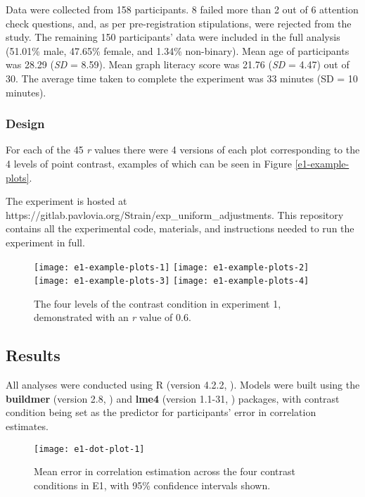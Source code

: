 \documentclass[preprint, 3p,
authoryear]{elsarticle} %
\begin{document}
Data were collected from 158 participants. 8 failed more than 2 out of 6
attention check questions, and, as per pre-registration stipulations,
were rejected from the study. The remaining 150 participants' data were
included in the full analysis (51.01\% male, 47.65\% female, and 1.34\%
non-binary). Mean age of participants was 28.29 (\emph{SD} = 8.59). Mean
graph literacy score was 21.76 (\emph{SD} = 4.47) out of 30. The average
time taken to complete the experiment was 33 minutes (SD = 10 minutes).

\hypertarget{design}{%
\subsubsection{Design}\label{design}}

For each of the 45 \emph{r} values there were 4 versions of each plot
corresponding to the 4 levels of point contrast, examples of which can
be seen in Figure \ref{e1-example-plots}.

The experiment is hosted at
https://gitlab.pavlovia.org/Strain/exp\_uniform\_adjustments. This
repository contains all the experimental code, materials, and
instructions needed to run the experiment in full.

\begin{figure}

\texttt{[image: e1-example-plots-1]} \texttt{[image: e1-example-plots-2]} \texttt{[image: e1-example-plots-3]} \texttt{[image: e1-example-plots-4]} \hfill{}

\caption{\label{e1-example-plots}The four levels of the contrast condition in experiment 1, demonstrated with an \textit{r} value of 0.6.}\label{fig:e1-example-plots}
\end{figure}

\hypertarget{results}{%
\subsection{Results}\label{results}}

All analyses were conducted using R (version 4.2.2, \citealp{r_core}).
Models were built using the \textbf{buildmer} (version 2.8,
\citealp{voeten_buildmer_2022}) and \textbf{lme4} (version 1.1-31,
\citealp{bates_lme4_2015}) packages, with contrast condition being set
as the predictor for participants' error in correlation estimates.

\begin{figure}

\texttt{[image: e1-dot-plot-1]} \hfill{}

\caption{\label{e1-dot-plot}Mean error in correlation estimation across the four contrast conditions in E1, with 95\% confidence intervals shown.}\label{fig:e1-dot-plot}
\end{figure}
\end{document}
